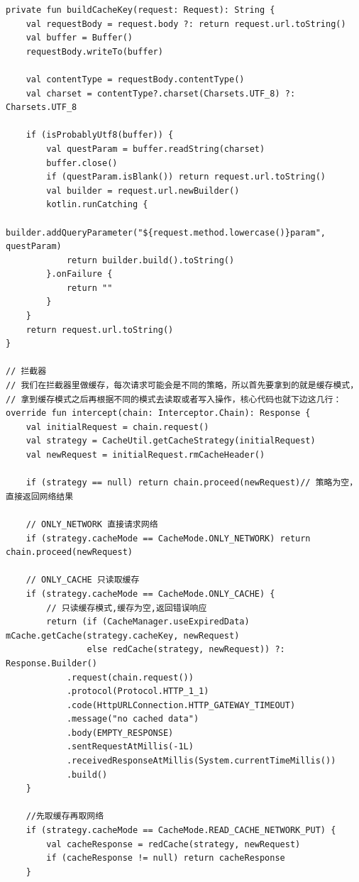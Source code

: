 \documentclass[9pt, b5paper]{article}
\begin{document}
\begin{verbatim}
private fun buildCacheKey(request: Request): String {
    val requestBody = request.body ?: return request.url.toString()
    val buffer = Buffer()
    requestBody.writeTo(buffer)

    val contentType = requestBody.contentType()
    val charset = contentType?.charset(Charsets.UTF_8) ?: Charsets.UTF_8

    if (isProbablyUtf8(buffer)) {
        val questParam = buffer.readString(charset)
        buffer.close()
        if (questParam.isBlank()) return request.url.toString()
        val builder = request.url.newBuilder()
        kotlin.runCatching {
            builder.addQueryParameter("${request.method.lowercase()}param", questParam)
            return builder.build().toString()
        }.onFailure {
            return ""
        }
    }
    return request.url.toString()
}

// 拦截器
// 我们在拦截器里做缓存，每次请求可能会是不同的策略，所以首先要拿到的就是缓存模式，
// 拿到缓存模式之后再根据不同的模式去读取或者写入操作，核心代码也就下边这几行：
override fun intercept(chain: Interceptor.Chain): Response {
    val initialRequest = chain.request()
    val strategy = CacheUtil.getCacheStrategy(initialRequest)
    val newRequest = initialRequest.rmCacheHeader()

    if (strategy == null) return chain.proceed(newRequest)// 策略为空，直接返回网络结果

    // ONLY_NETWORK 直接请求网络
    if (strategy.cacheMode == CacheMode.ONLY_NETWORK) return chain.proceed(newRequest)

    // ONLY_CACHE 只读取缓存
    if (strategy.cacheMode == CacheMode.ONLY_CACHE) {
        // 只读缓存模式,缓存为空,返回错误响应
        return (if (CacheManager.useExpiredData) mCache.getCache(strategy.cacheKey, newRequest)
                else redCache(strategy, newRequest)) ?: Response.Builder()
            .request(chain.request())
            .protocol(Protocol.HTTP_1_1)
            .code(HttpURLConnection.HTTP_GATEWAY_TIMEOUT)
            .message("no cached data")
            .body(EMPTY_RESPONSE)
            .sentRequestAtMillis(-1L)
            .receivedResponseAtMillis(System.currentTimeMillis())
            .build()
    }

    //先取缓存再取网络
    if (strategy.cacheMode == CacheMode.READ_CACHE_NETWORK_PUT) {
        val cacheResponse = redCache(strategy, newRequest)
        if (cacheResponse != null) return cacheResponse
    }


\end{verbatim}
\end{document}
